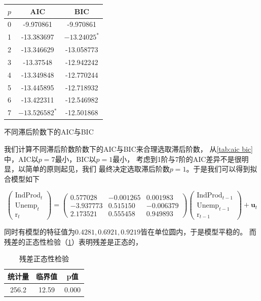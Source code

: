 \documentclass[cn]{homework}
\begin{document}
    \begin{margintable}
        \centering
        \begin{tabular}{ccc}
            \toprule
            $p$ & AIC  & BIC \\
            \midrule
            0 & -9.970861 & -9.970861 \\
            1 & -13.383697 & $-13.24025^*$ \\
            2 & -13.346629 & -13.058773 \\
            3 & -13.37548 & -12.942242 \\
            4 & -13.349848 & -12.770244 \\
            5 & -13.445895 & -12.718932 \\
            6 & -13.422311 & -12.546982 \\
            7 & $-13.526582^*$ & -12.501868 \\
            \bottomrule
        \end{tabular}
        \caption{不同滞后阶数下的AIC与BIC}
        \label{tab:aic bic}
    \end{margintable}
    我们计算不同滞后阶数阶数下的AIC与BIC来合理选取滞后阶数，
    从\cref{tab:aic bic}中，AIC以$p=7$最小，BIC以$p=1$最小，
    考虑到1阶与7阶的AIC差异不是很明显，以简单的原则起见，我们
    最终决定选取滞后阶数$p=1$。于是我们可以得到拟合模型如下
    \begin{fullwidth}
    \def\ind{\text{IndProd}}
    \def\une{\text{Unemp}}
    \def\rrr{\text{r}}
    \[\begin{pmatrix}
        \ind_t\\
        \une_t\\
        \rrr_t
    \end{pmatrix}
    =\begin{pmatrix}
        0.577028 & -0.001265 & 0.001983 \\
        -3.937773 &  0.515150 & -0.006379 \\
        2.173521 & 0.555458 &  0.949893 
    \end{pmatrix}
    \begin{pmatrix}
        \ind_{t-1}\\
        \une_{t-1}\\
        \rrr_{t-1}
    \end{pmatrix}+\boldsymbol u_t\]
    \end{fullwidth}

    同时有模型的特征值为$0.4281,0.6921,0.9219$皆在单位圆内，于是模型平稳的。
    而残差的正态性检验（\cref{tab:normality}）表明残差是正态的，
    \begin{table}
        \centering
        \begin{tabular}{ccc}
            \toprule
            统计量 & 临界值 & p值 \\
            \midrule
            256.2 & 12.59 & 0.000
        \end{tabular}
        \caption{残差正态性检验}
        \label{tab:normality}
    \end{table}
\end{document}
